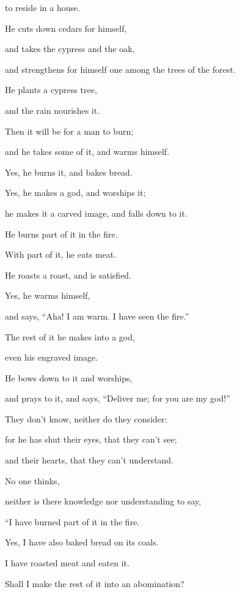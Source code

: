 {\par }{\QB to reside in a house.
\par }{\Q {}He cuts down cedars for himself,
\par }{\QB and takes the cypress and the oak,
\par }{\QB and strengthens for himself one among the trees of the forest.
\par }{\Q He plants a cypress tree,
\par }{\QB and the rain nourishes it.
\par }{\Q {}Then it will be for a man to burn;
\par }{\QB and he takes some of it, and warms himself.
\par }{\QB Yes, he burns it, and bakes bread.
\par }{\Q Yes, he makes a god, and worships it;
\par }{\QB he makes it a carved image, and falls down to it.
\par }{\Q {}He burns part of it in the fire.
\par }{\QB With part of it, he eats meat.
\par }{\QB He roasts a roast, and is satisfied.
\par }{\Q Yes, he warms himself,
\par }{\QB and says, “Aha! I am warm. I have seen the fire.”
\par }{\Q {}The rest of it he makes into a god,
\par }{\QB even his engraved image.
\par }{\Q He bows down to it and worships,
\par }{\QB and prays to it, and says, “Deliver me; for you are my god!”
\par }{\BB \par }{\Q {}They don’t know, neither do they consider:
\par }{\QB for he has shut their eyes, that they can’t see;
\par }{\QB and their hearts, that they can’t understand.
\par }{\Q {}No one thinks,
\par }{\QB neither is there knowledge nor understanding to say,
\par }{\QB “I have burned part of it in the fire.
\par }{\QB Yes, I have also baked bread on its coals.
\par }{\QB I have roasted meat and eaten it.
\par }{\QB Shall I make the rest of it into an abomination?
}

